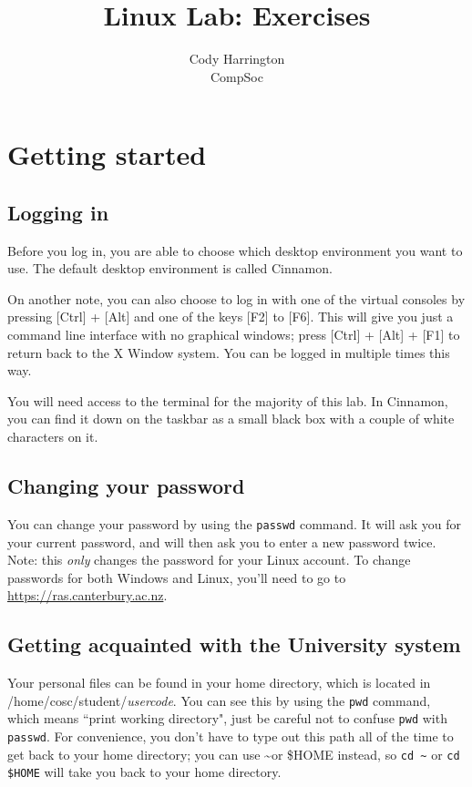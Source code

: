 \documentclass{article}
\begin{document}
\title{Linux Lab: Exercises}
\author{Cody Harrington\\CompSoc}
\maketitle

\section{Getting started}


\subsection{Logging in}
Before you log in, you are able to choose which desktop environment you want to use. The default desktop environment is called Cinnamon.

On another note, you can also choose to log in with one of the virtual consoles by pressing [Ctrl] + [Alt] and one of the keys [F2] to [F6]. This will give you just a command line interface with no graphical windows; press [Ctrl] + [Alt] + [F1] to return back to the X Window system. You can be logged in multiple times this way.

You will need access to the terminal for the majority of this lab. In Cinnamon, you can find it down on the taskbar as a small black box with a couple of white characters on it.

\subsection{Changing your password}
You can change your password by using the \texttt{passwd} command. It will ask you for your current password, and will then ask you to enter a new password twice. Note: this \emph{only} changes the password for your Linux account. To change passwords for both Windows and Linux, you'll need to go to \url{https://ras.canterbury.ac.nz}.

\subsection{Getting acquainted with the University system}
Your personal files can be found in your home directory, which is located in /home/cosc/student/\emph{usercode}. You can see this by using the \texttt{pwd} command, which means ``print working directory", just be careful not to confuse \texttt{pwd} with \texttt{passwd}. For convenience, you don't have to type out this path all of the time to get back to your home directory; you can use \textasciitilde  or \$HOME instead, so \texttt{cd \~} or \texttt{cd \$HOME} will take you back to your home directory.
\end{document}
